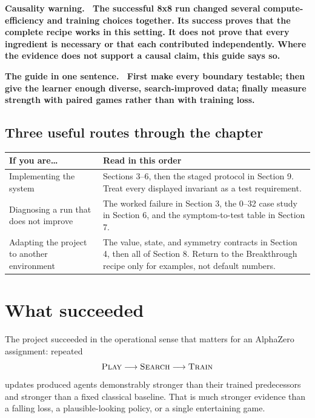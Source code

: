\documentclass[10.5pt,letterpaper]{article}
\newcommand{\boxtitle}[1]{\sffamily\bfseries\color{deepblue}#1.\ }
\begin{document}
\begin{warningbox}
\boxtitle{Causality warning}
The successful 8x8 run changed several compute-efficiency and training choices
together. Its success proves that the complete recipe works in this setting.
It does not prove that every ingredient is necessary or that each contributed
independently. Where the evidence does not support a causal claim, this guide
says so.
\end{warningbox}

\begin{plainbox}
\boxtitle{The guide in one sentence}
First make every boundary testable; then give the learner enough diverse,
search-improved data; finally measure strength with paired games rather than
with training loss.
\end{plainbox}

\subsection*{Three useful routes through the chapter}

\begin{center}
\small
\begin{tabularx}{\textwidth}{L{0.22\textwidth} Y}
\toprule
\sffamily\bfseries If you are\ldots &
\sffamily\bfseries Read in this order \\
\midrule
Implementing the system &
Sections 3--6, then the staged protocol in Section 9. Treat every displayed
invariant as a test requirement. \\
Diagnosing a run that does not improve &
The worked failure in Section 3, the 0--32 case study in Section 6, and the
symptom-to-test table in Section 7. \\
Adapting the project to another environment &
The value, state, and symmetry contracts in Section 4, then all of Section 8.
Return to the Breakthrough recipe only for examples, not default numbers. \\
\bottomrule
\end{tabularx}
\end{center}

\section{What succeeded}

The project succeeded in the operational sense that matters for an AlphaZero
assignment: repeated
\[
  \textsc{Play} \longrightarrow \textsc{Search} \longrightarrow
  \textsc{Train}
\]
updates produced agents demonstrably stronger than their trained predecessors
and stronger than a fixed classical baseline. That is much stronger evidence
than a falling loss, a plausible-looking policy, or a single entertaining game.
\end{document}
